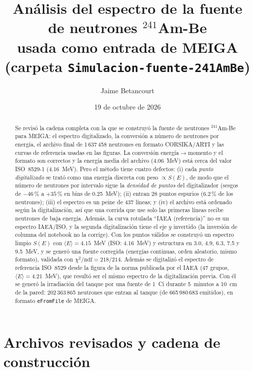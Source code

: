 \documentclass[11pt,a4paper]{article}
\title{Análisis del espectro de la fuente de neutrones $^{241}$Am-Be\\
\large usada como entrada de MEIGA (carpeta \texttt{Simulacion-fuente-241AmBe})}
\author{Jaime Betancourt}
\date{19 de octubre de 2026}
\begin{document}
\maketitle

\begin{abstract}
Se revisó la cadena completa con la que se construyó la fuente de neutrones $^{241}$Am-Be para MEIGA:
el espectro digitalizado, la conversión a número de neutrones por energía, el archivo final de
1\,637\,458 neutrones en formato CORSIKA/ARTI y las curvas de referencia usadas en las figuras.
La conversión energía$\to$momento y el formato son correctos y la energía media del archivo
(4.06~MeV) está cerca del valor ISO~8529-1 (4.16~MeV). Pero el método tiene cuatro defectos: (i) cada
\emph{punto digitalizado} se trató como una energía discreta con peso $\propto S(E)$, de modo que el
número de neutrones por intervalo sigue la \emph{densidad de puntos} del digitalizador (sesgos de
$-46$\,\% a $+35$\,\% en bins de 0.25~MeV); (ii) entran 28 puntos espurios (6.2\,\% de los
neutrones); (iii) el espectro es un peine de 437 líneas; y (iv) el archivo está ordenado según la
digitalización, así que una corrida que use solo las primeras líneas recibe neutrones de baja energía.
Además, la curva rotulada ``IAEA (referencia)'' no es un espectro IAEA/ISO, y la segunda digitalización
tiene el eje $y$ invertido (la inversión de columna del notebook no la corrige). Con los puntos válidos
se construyó un espectro limpio $S(E)$ con $\langle E\rangle=4.15$~MeV (ISO: 4.16~MeV) y estructura
en 3.0, 4.9, 6.3, 7.5 y 9.5~MeV, y se generó una fuente corregida (energías continuas, orden
aleatorio, mismo formato), validada con $\chi^2/\mathrm{ndf}=218/214$.
Además se digitalizó el espectro de referencia ISO~8529 desde la figura de la norma publicada por el IAEA
(47 grupos, $\langle E\rangle=4.21$~MeV), que resultó ser el mismo espectro de la digitalización previa.
Con él se generó la irradiación del tanque por una fuente de 1~Ci durante 5~minutos a 10~cm de la pared:
202\,363\,865 neutrones que entran al tanque (de 665\,980\,683 emitidos), en formato \texttt{eFromFile} de MEIGA.
\end{abstract}

\tableofcontents

\section{Archivos revisados y cadena de construcción}
\end{document}
